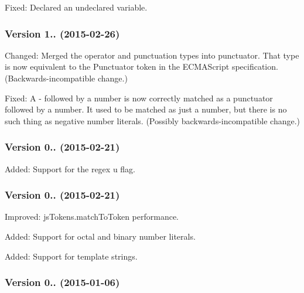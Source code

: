 \begin{DoxyItemize}
\item Fixed\+: Declared an undeclared variable.
\end{DoxyItemize}

\subsubsection*{Version 1.. (2015-\/02-\/26)}


\begin{DoxyItemize}
\item Changed\+: Merged the \textquotesingle{}operator\textquotesingle{} and \textquotesingle{}punctuation\textquotesingle{} types into \textquotesingle{}punctuator\textquotesingle{}. That type is now equivalent to the Punctuator token in the E\+C\+M\+A\+Script specification. (Backwards-\/incompatible change.)
\item Fixed\+: A {\ttfamily -\/} followed by a number is now correctly matched as a punctuator followed by a number. It used to be matched as just a number, but there is no such thing as negative number literals. (Possibly backwards-\/incompatible change.)
\end{DoxyItemize}

\subsubsection*{Version 0.. (2015-\/02-\/21)}


\begin{DoxyItemize}
\item Added\+: Support for the regex {\ttfamily u} flag.
\end{DoxyItemize}

\subsubsection*{Version 0.. (2015-\/02-\/21)}


\begin{DoxyItemize}
\item Improved\+: {\ttfamily js\+Tokens.\+match\+To\+Token} performance.
\item Added\+: Support for octal and binary number literals.
\item Added\+: Support for template strings.
\end{DoxyItemize}

\subsubsection*{Version 0.. (2015-\/01-\/06)}


